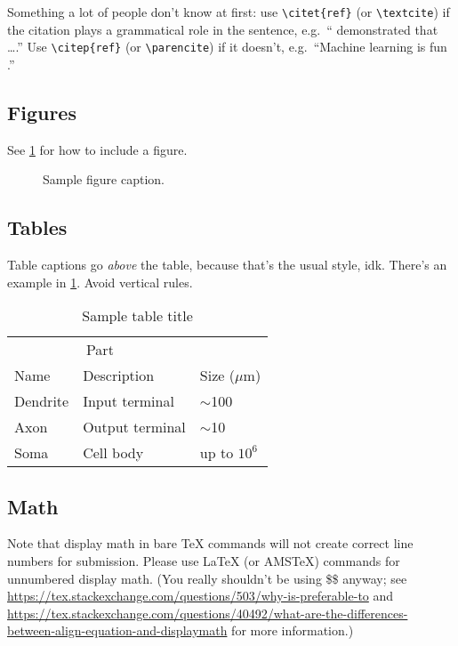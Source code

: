 \documentclass{article}
\let\citet\textcite    %
\let\citep\parencite   %
\begin{document}
Something a lot of people don't know at first:
use \verb+\citet{ref}+ (or \verb+\textcite+)
if the citation plays a grammatical role in the sentence,
e.g.\ ``\citet{transformers} demonstrated that \dots.''
Use \verb+\citep{ref}+ (or \verb+\parencite+)
if it doesn't, e.g.\ ``Machine learning is fun \citep{ml-is-fun}.''


\subsection{Figures}

See \cref{fig:sample} for how to include a figure.

\begin{figure}
  \centering
  \caption{Sample figure caption.}
  \label{fig:sample}
\end{figure}


\subsection{Tables}

Table captions go \emph{above} the table,
because that's the usual style, idk.
There's an example in \cref{tab:sample}.
Avoid vertical rules.

\begin{table}
  \caption{Sample table title}
  \label{tab:sample}
  \centering
  \begin{tabular}{lll}
    \toprule
    \multicolumn{2}{c}{Part}                   \\
    \cmidrule(r){1-2}
    Name     & Description     & Size ($\mu$m) \\
    \midrule
    Dendrite & Input terminal  & $\sim$100     \\
    Axon     & Output terminal & $\sim$10      \\
    Soma     & Cell body       & up to $10^6$  \\
    \bottomrule
  \end{tabular}
\end{table}

\subsection{Math}
Note that display math in bare TeX commands will not create correct line numbers for submission. Please use LaTeX (or AMSTeX) commands for unnumbered display math. (You really shouldn't be using \$\$ anyway; see \url{https://tex.stackexchange.com/questions/503/why-is-preferable-to} and \url{https://tex.stackexchange.com/questions/40492/what-are-the-differences-between-align-equation-and-displaymath} for more information.)
\end{document}
